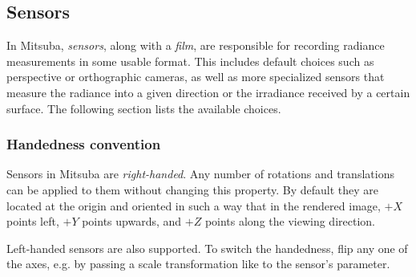 \newpage
\subsection{Sensors}
\label{sec:sensors}
In Mitsuba, \emph{sensors}, along with a \emph{film}, are responsible for recording radiance
measurements in some usable format. This includes default choices such as perspective
or orthographic cameras, as well as more specialized sensors that measure the radiance
into a given direction or the irradiance received by a certain surface. The following
section lists the available choices.

\subsubsection*{Handedness convention}
Sensors in Mitsuba are \emph{right-handed}. 
Any number of rotations and translations can be applied to them
without changing this property. By default they are located at the
origin and oriented in such a way that in the rendered image, $+X$ points left,
$+Y$ points upwards, and $+Z$ points along the viewing direction.

Left-handed sensors are also supported. To switch the handedness,
flip any one of the axes, e.g. by passing a scale transformation like 
 to the sensor's  parameter.
